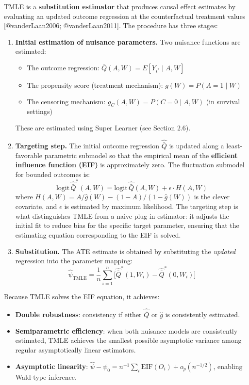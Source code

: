 \documentclass[
  letterpaper,
  DIV=11,
  numbers=noendperiod]{scrartcl}
\providecommand{\tightlist}{%
  \setlength{\itemsep}{0pt}\setlength{\parskip}{0pt}}\usepackage{longtable,booktabs,array}
\begin{document}
TMLE is a \textbf{substitution estimator} that produces causal effect
estimates by evaluating an updated outcome regression at the
counterfactual treatment values {[}@vanderLaan2006; @vanderLaan2011{]}.
The procedure has three stages:

\begin{enumerate}
\def\labelenumi{\arabic{enumi}.}
\item
  \textbf{Initial estimation of nuisance parameters.} Two nuisance
  functions are estimated:

  \begin{itemize}
  \tightlist
  \item
    The outcome regression: \(\bar{Q}(A, W) = E[Y_{t^*} \mid A, W]\)
  \item
    The propensity score (treatment mechanism):
    \(g(W) = P(A = 1 \mid W)\)
  \item
    The censoring mechanism: \(g_C(A, W) = P(C = 0 \mid A, W)\) (in
    survival settings)
  \end{itemize}

  These are estimated using Super Learner (see Section 2.6).
\item
  \textbf{Targeting step.} The initial outcome regression
  \(\hat{\bar{Q}}\) is updated along a least-favorable parametric
  submodel so that the empirical mean of the \textbf{efficient influence
  function (EIF)} is approximately zero. The fluctuation submodel for
  bounded outcomes is:
  \[\text{logit}\,\hat{\bar{Q}}^*(A, W) = \text{logit}\,\hat{\bar{Q}}(A, W) + \epsilon \cdot H(A, W)\]
  where \(H(A, W) = A/\hat{g}(W) - (1-A)/(1-\hat{g}(W))\) is the clever
  covariate, and \(\epsilon\) is estimated by maximum likelihood. The
  targeting step is what distinguishes TMLE from a naive plug-in
  estimator: it adjusts the initial fit to reduce bias for the specific
  target parameter, ensuring that the estimating equation corresponding
  to the EIF is solved.
\item
  \textbf{Substitution.} The ATE estimate is obtained by substituting
  the \emph{updated} regression into the parameter mapping:
  \[\hat{\psi}_{\text{TMLE}} = \frac{1}{n}\sum_{i=1}^n \bigl[\hat{\bar{Q}}^*(1, W_i) - \hat{\bar{Q}}^*(0, W_i)\bigr]\]
\end{enumerate}

Because TMLE solves the EIF equation, it achieves:

\begin{itemize}
\tightlist
\item
  \textbf{Double robustness}: consistency if either \(\hat{\bar{Q}}\) or
  \(\hat{g}\) is consistently estimated.
\item
  \textbf{Semiparametric efficiency}: when both nuisance models are
  consistently estimated, TMLE achieves the smallest possible asymptotic
  variance among regular asymptotically linear estimators.
\item
  \textbf{Asymptotic linearity}:
  \(\hat{\psi} - \psi_0 = n^{-1}\sum_{i} \text{EIF}(O_i) + o_p(n^{-1/2})\),
  enabling Wald-type inference.
\end{itemize}
\end{document}
